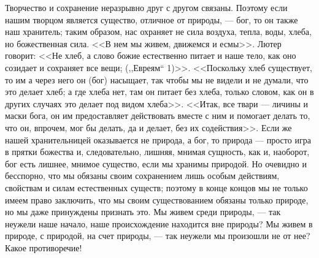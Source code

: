 \documentclass[12pt]{article}
\begin{document}
Творчество и сохранение неразрывно друг с другом связаны. Поэтому если нашим творцом является существо, отличное от природы, --- бог, то он также наш хранитель; таким образом, нас охраняет не сила воздуха, тепла, воды, хлеба, но божественная сила. <<В нем мы живем, движемся и есмы>>. Лютер говорит: <<Не хлеб, а слово божие естественно питает и наше тело, как оно созидает и сохраняет все вещи; (,,Евреям`` 1)>>. <<Поскольку хлеб существует, то им а через него он (бог) насыщает, так чтобы мы не видели и не думали, что это делает хлеб; а где хлеба нет, там он питает без хлеба, только словом, как он в других случаях это делает под видом хлеба>>. <<Итак, все твари --- личины и маски бога, он им предоставляет действовать вместе с ним и помогает делать то, что он, впрочем, мог бы делать, да и делает, без их содействия>>. Если же нашей хранительницей оказывается не природа, а бог, то природа --- просто игра в прятки божества и, следовательно, лишняя, мнимая сущность, как и, наоборот, бог есть лишнее, мнимое существо, если мы хранимы природой. Но очевидно и бесспорно, что мы обязаны своим сохранением лишь особым действиям, свойствам и силам естественных существ; поэтому в конце концов мы не только имеем право заключить, что мы своим существованием обязаны только природе, но мы даже принуждены признать это. Мы живем среди природы, --- так неужели наше начало, наше происхождение находится вне природы? Мы живем в природе, с природой, на счет природы, --- так неужели мы произошли не от нее? Какое противоречие!

\section{}
\end{document}
